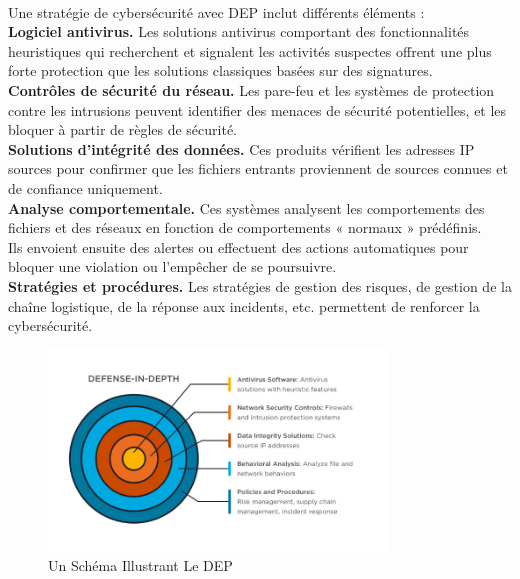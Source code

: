   \paragraph{ }
  Une stratégie de cybersécurité avec DEP inclut différents éléments :\\
  
  \textbf{Logiciel antivirus.} 
  Les solutions antivirus comportant des fonctionnalités heuristiques qui recherchent et signalent les activités suspectes offrent une plus forte protection que les solutions classiques basées sur des signatures.\\
  
  \textbf{Contrôles de sécurité du réseau.} 
  Les pare-feu et les systèmes de protection contre les intrusions peuvent identifier des menaces de sécurité potentielles, et les bloquer à partir de règles de sécurité.\\
  
  \textbf{Solutions d’intégrité des données.}
   Ces produits vérifient les adresses IP sources pour confirmer que les fichiers entrants proviennent de sources connues et de confiance uniquement.\\
   
  \textbf{Analyse comportementale.} Ces systèmes analysent les comportements des fichiers et des réseaux en fonction de comportements « normaux » prédéfinis.\\
   Ils envoient ensuite des alertes ou effectuent des actions automatiques pour bloquer une violation ou l’empêcher de se poursuivre.\\
   
  \textbf{Stratégies et procédures.} Les stratégies de gestion des risques, de gestion de la chaîne logistique, de la réponse aux incidents, etc. permettent de renforcer la cybersécurité.\\
  	\begin{figure}[h]
  		\begin{center}
  		\includegraphics[width=0.8\textwidth]{PhotoMemoire/dep_image.png}
  		\caption{Un Schéma Illustrant Le DEP }
  	\end{center}
  	\end{figure}
   


